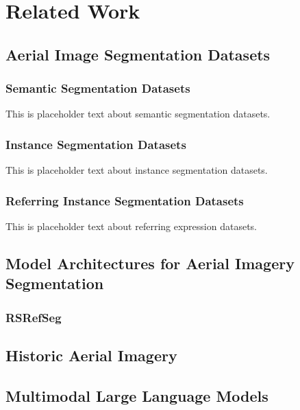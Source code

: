 \section{Related Work}

\subsection{Aerial Image Segmentation Datasets}

\subsubsection{Semantic Segmentation Datasets}

This is placeholder text about semantic segmentation datasets.

\subsubsection{Instance Segmentation Datasets}

This is placeholder text about instance segmentation datasets.

\subsubsection{Referring Instance Segmentation Datasets}

This is placeholder text about referring expression datasets.

\subsection{Model Architectures for Aerial Imagery Segmentation}

\subsubsection{RSRefSeg}


\subsection{Historic Aerial Imagery}


\subsection{Multimodal Large Language Models}



